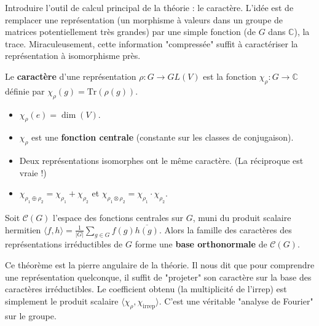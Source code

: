\begin{objectif}
    Introduire l'outil de calcul principal de la théorie : le caractère. L'idée est de remplacer une représentation (un morphisme à valeurs dans un groupe de matrices potentiellement très grandes) par une simple fonction (de $G$ dans $\mathbb{C}$), la trace. Miraculeusement, cette information "compressée" suffit à caractériser la représentation à isomorphisme près.
\end{objectif}

\begin{definition}[Caractère]
    Le \textbf{caractère} d'une représentation $\rho: G \to GL(V)$ est la fonction $\chi_\rho: G \to \mathbb{C}$ définie par $\chi_\rho(g) = \mathrm{Tr}(\rho(g))$.
\end{definition}

\begin{proposition}
    \begin{itemize}
        \item $\chi_\rho(e) = \dim(V)$.
        \item $\chi_\rho$ est une \textbf{fonction centrale} (constante sur les classes de conjugaison).
        \item Deux représentations isomorphes ont le même caractère. (La réciproque est vraie !)
        \item $\chi_{\rho_1 \oplus \rho_2} = \chi_{\rho_1} + \chi_{\rho_2}$ et $\chi_{\rho_1 \otimes \rho_2} = \chi_{\rho_1} \cdot \chi_{\rho_2}$.
    \end{itemize}
\end{proposition}

\begin{theorem}
    Soit $\mathcal{C}(G)$ l'espace des fonctions centrales sur $G$, muni du produit scalaire hermitien $\langle f, h \rangle = \frac{1}{|G|} \sum_{g \in G} f(g) \overline{h(g)}$.
    Alors la famille des caractères des représentations irréductibles de $G$ forme une \textbf{base orthonormale} de $\mathcal{C}(G)$.
\end{theorem}

\begin{remark}
    Ce théorème est la pierre angulaire de la théorie. Il nous dit que pour comprendre une représentation quelconque, il suffit de "projeter" son caractère sur la base des caractères irréductibles. Le coefficient obtenu (la multiplicité de l'irrep) est simplement le produit scalaire $\langle \chi_\rho, \chi_{\mathrm{irrep}} \rangle$. C'est une véritable "analyse de Fourier" sur le groupe.
\end{remark}

